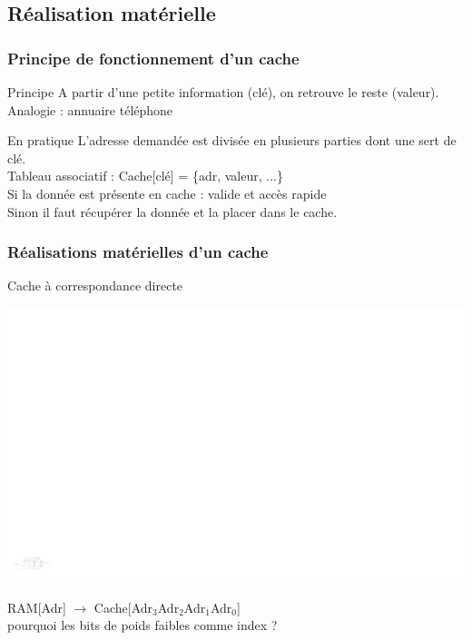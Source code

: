 \documentclass{beamer}
\begin{document}
\subsection{Réalisation matérielle}

\begin{frame}
\frametitle{Principe de fonctionnement d'un cache}

\begin{block}{Principe}
A partir d'une petite information (clé), on retrouve le reste (valeur).\\
Analogie : annuaire téléphone
\end{block}

\begin{block}{En pratique}
L'adresse demandée est divisée en plusieurs parties dont une sert de clé.\\
Tableau associatif : Cache[clé] = \{adr, valeur, ...\}\\
Si la donnée est présente en cache : valide et accès rapide\\
Sinon il faut récupérer la donnée et la placer dans le cache.
\end{block}

\end{frame}

\begin{frame}
\frametitle{Réalisations matérielles d'un cache}
\begin{block}{Cache à correspondance directe}

\includegraphics[width=\linewidth]{Figs/direct_cache.pdf}

\end{block}
RAM[Adr] $\rightarrow$ Cache[Adr$_3$Adr$_2$Adr$_1$Adr$_0$]\\
pourquoi les bits de poids faibles comme index ?
\end{frame}
\end{document}

